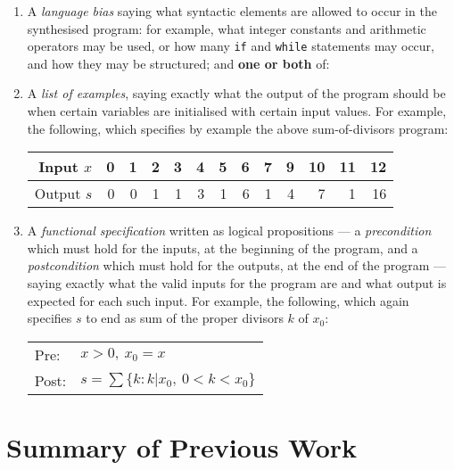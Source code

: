 \documentclass[a4paper,twoside,notitlepage,12pt]{article}
\begin{document}
\begin{enumerate}
    \item A \emph{language bias} saying what syntactic elements are allowed to occur in 
    the synthesised program: for example, what integer constants and arithmetic 
    operators may be used, or how many \verb|if| and \verb|while| statements may 
    occur, and how they may be structured; and \textbf{one or both} of:

    \item A \emph{list of examples}, saying exactly what the output of the program 
    should be when certain variables are initialised with certain input values. For 
    example, the following, which specifies by example the above 
    sum-of-divisors program:
    
    \begin{tabular}{| r || r | r | r | r | r | r | r | r | r | r | r | r |}
        \hline
        Input $x$  & 0 & 1 & 2 & 3 & 4 & 5 & 6 & 7 & 9 & 10 & 11 & 12 \\
        \hline
        Output $s$ & 0 & 0 & 1 & 1 & 3 & 1 & 6 & 1 & 4 &  7 &  1 & 16 \\
        \hline
    \end{tabular}

    \item A \emph{functional specification} written as logical propositions --- a 
    \emph{precondition} which must hold for the inputs, at the beginning of the 
    program, and a \emph{postcondition} which must hold for the outputs, at the end of 
    the program --- saying exactly what the valid inputs for the program are and 
    what output is expected for each such input. For example, the following, which 
    again specifies $s$ to end as sum of the proper divisors $k$ of $x_0$:
    
    \begin{tabular}{|ll|}
        \hline
        Pre:  & $x > 0,\ x_0 = x$ \\
        Post: & $s = \sum\{k : k|x_0,\ 0<k<x_0\}$ \\
        \hline
    \end{tabular}
    
\end{enumerate}

\clearpage
\section{Summary of Previous Work} \label{sec:prv}
\end{document}
